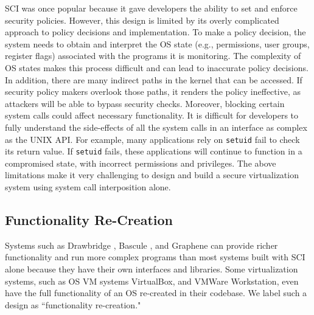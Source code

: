 SCI was once popular
because it gave developers the ability to set and enforce security policies.
However, this design is limited by its overly complicated approach to policy
decisions and implementation.
To make a policy decision, the system needs to
obtain and interpret the OS state (e.g., permissions, user groups, register flags)
associated with the programs it is monitoring.
The complexity of OS states makes this process difficult and can lead to
inaccurate policy decisions.
In addition, there are many indirect paths in the kernel that can be accessed.
If security policy makers overlook those paths, it renders the
policy ineffective, as attackers will be able to
bypass security checks.
Moreover, blocking
certain system calls could affect necessary functionality.
It is difficult for developers to fully understand the side-effects of all the
system calls in an interface as complex as the UNIX API.
For example, many applications rely on \texttt{setuid} fail to check its return value.
If \texttt{setuid} fails, these applications will continue to function in a compromised state,
with incorrect permissions and privileges.
The above limitations make it very challenging to design and build a secure virtualization system using
system call interposition alone.

\subsection{Functionality Re-Creation}
Systems such as  Drawbridge \cite{Drawbridge-11},
 Bascule \cite{Bascule}, and Graphene \cite{Graphene-14} can
provide richer functionality and run more complex programs than most systems built
with SCI alone because they have their own
interfaces and libraries. Some virtualization
systems, such as OS VM systems VirtualBox, and VMWare Workstation, even have the
full functionality of an OS re-created in their codebase. We label such a design
as ``functionality re-creation."

